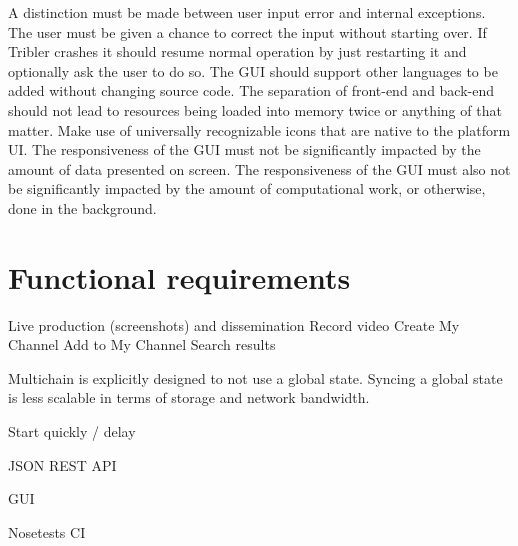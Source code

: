 A distinction must be made between user input error and internal exceptions.
The user must be given a chance to correct the input without starting over.
If Tribler crashes it should resume normal operation by just restarting it and optionally ask the user to do so.
The GUI should support other languages to be added without changing source code.
The separation of front-end and back-end should not lead to resources being loaded into memory twice or anything of that matter.
Make use of universally recognizable icons that are native to the platform UI.
The responsiveness of the GUI must not be significantly impacted by the amount of data presented on screen.
The responsiveness of the GUI must also not be significantly impacted by the amount of computational work, or otherwise, done in the background.


\section{Functional requirements}



Live production (screenshots) and dissemination
Record video
Create My Channel
Add to My Channel
Search results


Multichain is explicitly designed to not use a global state.
Syncing a global state is less scalable in terms of storage and network bandwidth.


Start quickly / delay

JSON REST API

GUI

Nosetests CI



